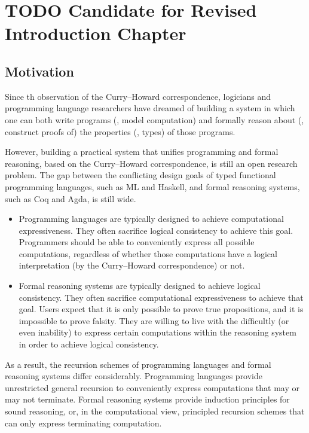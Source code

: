 \chapter{TODO Candidate for Revised Introduction Chapter}
\label{APP:ch:intro}

\section{Motivation}\label{APP:sec:intro:motiv}
Since th observation of the Curry--Howard correspondence,
logicians and programming language researchers have  dreamed of
building a system in which one can both write programs (\ie, model computation)
and formally reason about (\ie, construct proofs of) the properties (\ie, types)
of those programs.

However, building a practical system that unifies programming and
formal reasoning, based on the Curry--Howard correspondence, is still
an open research problem. The gap between the conflicting
design goals of typed functional programming languages, such as ML and Haskell,
and formal reasoning systems, such as Coq and Agda, is still wide.

\begin{itemize}

\item
Programming languages are typically designed to achieve
computational expressiveness. They often sacrifice logical consistency
to achieve this goal. Programmers should be able to
conveniently express all possible computations, regardless of whether those
computations have a logical interpretation (by the Curry--Howard correspondence)
or not.

\item
Formal reasoning systems are typically designed to achieve logical consistency.
They often sacrifice computational expressiveness to achieve that goal.
Users expect that it is only possible to prove true propositions,
and it is impossible to prove falsity. They are willing to live with
the difficultly (or even inability) to express certain computations
within the reasoning system in order to achieve logical consistency.

\end{itemize}

As a result, the recursion schemes of programming languages and
formal reasoning systems differ considerably.
Programming languages provide unrestricted general recursion
to conveniently express computations that may or may not terminate.
Formal reasoning systems provide induction principles for sound reasoning,
or, in the computational view, principled recursion schemes
that can only express terminating computation.

